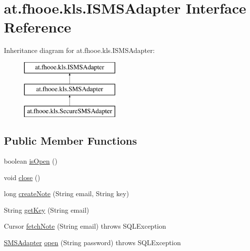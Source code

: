 \hypertarget{interfaceat_1_1fhooe_1_1kls_1_1_i_s_m_s_adapter}{\section{at.\-fhooe.\-kls.\-I\-S\-M\-S\-Adapter Interface Reference}
\label{interfaceat_1_1fhooe_1_1kls_1_1_i_s_m_s_adapter}
}
Inheritance diagram for at.\-fhooe.\-kls.\-I\-S\-M\-S\-Adapter\-:\begin{figure}[H]
\begin{center}
\leavevmode
\includegraphics[height=3.000000cm]{interfaceat_1_1fhooe_1_1kls_1_1_i_s_m_s_adapter}
\end{center}
\end{figure}
\subsection*{Public Member Functions}
\begin{DoxyCompactItemize}
\item 
boolean \hyperlink{interfaceat_1_1fhooe_1_1kls_1_1_i_s_m_s_adapter_a6bb1775e3fdc638c8b7e422502d85fa6}{is\-Open} ()
\item 
void \hyperlink{interfaceat_1_1fhooe_1_1kls_1_1_i_s_m_s_adapter_a8a10e83175a3179bd8f9a02e7a494820}{close} ()
\item 
long \hyperlink{interfaceat_1_1fhooe_1_1kls_1_1_i_s_m_s_adapter_a568276244f15d6c5fe1c1b0caee25f46}{create\-Note} (String email, String key)
\item 
String \hyperlink{interfaceat_1_1fhooe_1_1kls_1_1_i_s_m_s_adapter_a79ea0a9229ba30313b133b1e9d248c89}{get\-Key} (String email)
\item 
Cursor \hyperlink{interfaceat_1_1fhooe_1_1kls_1_1_i_s_m_s_adapter_af04be729ebb94e0fba028b0a2bbf30fe}{fetch\-Note} (String email)  throws S\-Q\-L\-Exception
\item 
\hyperlink{classat_1_1fhooe_1_1kls_1_1_s_m_s_adapter}{S\-M\-S\-Adapter} \hyperlink{interfaceat_1_1fhooe_1_1kls_1_1_i_s_m_s_adapter_aadf3c5039b5140a42b45f64d31e0403c}{open} (String password)  throws S\-Q\-L\-Exception
\end{DoxyCompactItemize}


